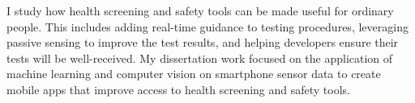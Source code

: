 \justify
I study how health screening and safety tools can be made useful for ordinary people. 
This includes adding real-time guidance to testing procedures, leveraging passive sensing to improve the test results, and helping developers ensure their tests will be well-received.
My dissertation work focused on the application of machine learning and computer vision on smartphone sensor data to create mobile apps that improve access to health screening and safety tools. 